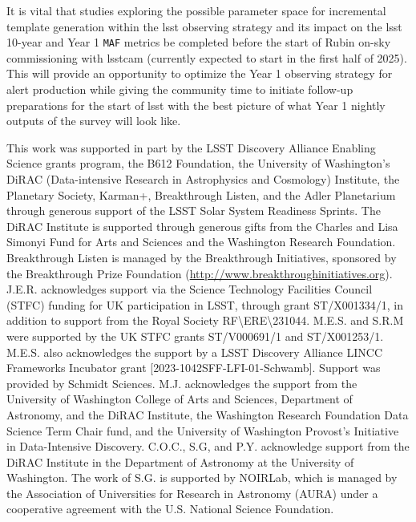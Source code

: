 \documentclass[preprintm,linenumbers]{aastex631}
\newcommand{\maf}{\texttt{MAF}\xspace}
\begin{document}
It is vital that studies exploring the possible parameter space for incremental template generation within the \gls*{lsst} observing strategy and its impact on the \gls*{lsst} 10-year and Year 1 \maf metrics be completed before the start of Rubin on-sky commissioning with \gls*{lsstcam} (currently expected to start in the first half of 2025). 
This will provide an opportunity to optimize the Year 1 observing strategy for alert production while giving the community time to initiate follow-up preparations for the start of \gls*{lsst} with the best picture of what Year 1 nightly outputs of the survey will look like.
		
\begin{acknowledgments}

This work was supported in part by the LSST Discovery Alliance Enabling Science grants program, the B612 Foundation, the University of Washington's DiRAC (Data-intensive Research in Astrophysics and Cosmology) Institute, the Planetary Society, Karman+, Breakthrough Listen, and the Adler Planetarium through generous support of the LSST Solar System Readiness Sprints. 
The DiRAC Institute is supported through generous gifts from the Charles and Lisa Simonyi Fund for Arts and Sciences and the Washington Research Foundation.
Breakthrough Listen is managed by the Breakthrough Initiatives, sponsored by the Breakthrough Prize Foundation (\url{http://www.breakthroughinitiatives.org}). 
J.E.R. acknowledges support via the Science Technology Facilities Council (STFC) funding for UK participation in LSST, through grant ST/X001334/1, in addition to support from the Royal Society RF\textbackslash ERE\textbackslash231044.
M.E.S. and S.R.M were supported by the UK STFC grants ST/V000691/1 and ST/X001253/1. 
M.E.S. also acknowledges the support by a LSST Discovery Alliance LINCC Frameworks Incubator grant [2023-1042SFF-LFI-01-Schwamb]. 
Support was provided by Schmidt Sciences. 
M.J. acknowledges the support from the University of Washington College of Arts and Sciences, Department of Astronomy, and the DiRAC Institute, the Washington Research Foundation Data Science Term Chair fund, and the University of Washington Provost's Initiative in Data-Intensive Discovery. 
C.O.C., S.G, and P.Y. acknowledge support from the DiRAC Institute in the Department of Astronomy at the University of Washington. 
The work of S.G. is supported by NOIRLab, which is managed by the Association of Universities for Research in Astronomy (AURA) under a cooperative agreement with the U.S. National Science Foundation.


\end{acknowledgments}
\end{document}
